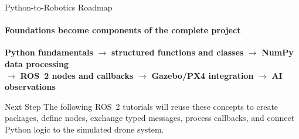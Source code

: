 \begin{frame}{Python-to-Robotics Roadmap}
\framesubtitle{Foundations become components of the complete project}
\begin{center}
\textbf{Python fundamentals}
\(\rightarrow\)
\textbf{structured functions and classes}
\(\rightarrow\)
\textbf{NumPy data processing}\\[0.5em]
\(\rightarrow\)
\textbf{ROS~2 nodes and callbacks}
\(\rightarrow\)
\textbf{Gazebo/PX4 integration}
\(\rightarrow\)
\textbf{AI observations}
\end{center}
\pause
\begin{exampleblock}{Next Step}
The following ROS~2 tutorials will reuse these concepts to create packages, define nodes, exchange typed messages, process callbacks, and connect Python logic to the simulated drone system.
\end{exampleblock}
\end{frame}








